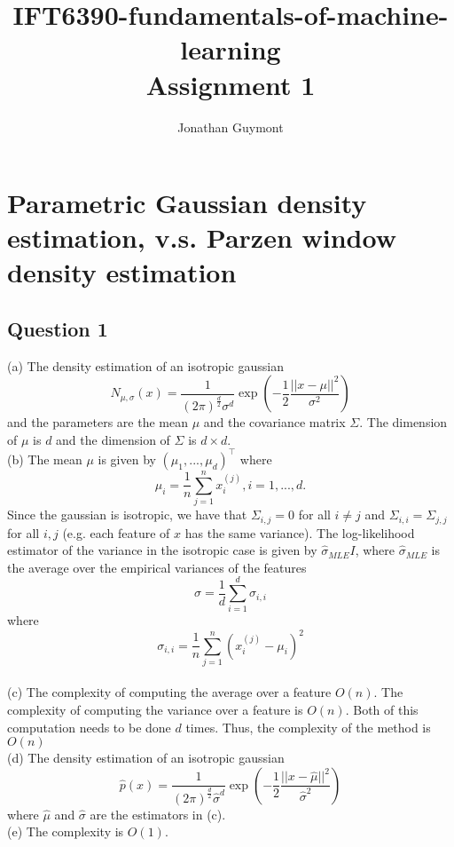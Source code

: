 \documentclass[12pt]{article}
\begin{document}
\title{IFT6390-fundamentals-of-machine-learning\\Assignment 1}
\author{Jonathan Guymont}
\maketitle

\section*{Parametric Gaussian density estimation, v.s. Parzen
window density estimation}

\subsection*{Question 1}
(a) The density estimation of an isotropic gaussian
$$
    N_{\mu, \sigma}(x)
    = \frac{1}{(2\pi)^\frac{d}{2}\sigma^d}
    \exp(-\frac{1}{2}\frac{||x-\mu||^2}{\sigma^2})
$$
and the parameters are the mean $\mu$ and the covariance matrix $\Sigma$. The dimension of $\mu$ is $d$ and the dimension of $\Sigma$ is $d\times d$.\\

(b) The mean $\mu$ is given by $(\mu_1,...,\mu_d)^\top$ where
$$
\mu_i = \frac{1}{n}\sum_{j=1}^n x^{(j)}_i, i=1,...,d. 
$$
Since the gaussian is isotropic, we have that $\Sigma_{i,j}=0$ for all $i\neq j$ and $\Sigma_{i,i}=\Sigma_{j,j}$ for all $i, j$ (e.g. each feature of $x$ has the same variance). The log-likelihood estimator of the variance in the isotropic case is given by $\hat{\sigma}_{MLE} I$, where $\hat{\sigma}_{MLE}$ is the average over the empirical variances of the features
$$
\sigma = \frac{1}{d}\sum_{i=1}^d \sigma_{i, i}
$$
where
$$
\sigma_{i, i} = \frac{1}{n}\sum_{j=1}^n (x^{(j)}_i-\mu_i)^2
$$\\

(c) The complexity of computing the average over a feature $O(n)$. The complexity of computing the variance over a feature is $O(n)$. Both of this computation needs to be done $d$ times. Thus, the complexity of the method is $O(n)$ \\

(d) The density estimation of an isotropic gaussian
$$
    \hat{p}(x)
    = \frac{1}{(2\pi)^\frac{d}{2}\hat{\sigma}^d}
    \exp(-\frac{1}{2}\frac{||x-\hat{\mu}||^2}{\hat{\sigma}^2})
$$
where $\hat{\mu}$ and $\hat{\sigma}$ are the estimators in (c).\\

(e) The complexity is $O(1)$.
\end{document}
